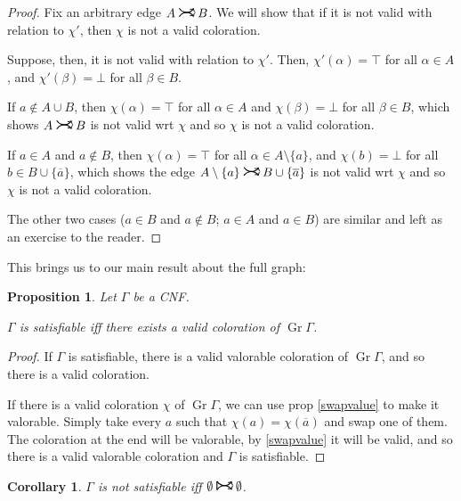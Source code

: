 \documentclass[11pt]{article}
\newcommand{\conj}[1]{\overline{#1}}
\DeclareMathOperator{\Gr}{Gr}
\newcommand{\rightcurvearrow}{
\mathrel{
  \begin{tikzpicture}[scale=0.8]
    \draw[thick,->] (0,1ex) arc (30:150:-2ex);
    \draw[thick,->] (0,-1ex) arc (150:30:2ex);
  \end{tikzpicture}
}
}
\newcommand{\Rightcurvearrow}{
\mathrel{
  \begin{tikzpicture}[scale=0.8]
    \draw[thick,->] (0,1ex) arc (30:150:-2ex);
    \draw[thick,->] (0,-1ex) arc (150:30:2ex);
    \draw[thick] (0, 1ex) -- (0, -1ex);
  \end{tikzpicture}
}
}
\newtheorem{prop}{Proposition}
\newtheorem{corollary}{Corollary}
\begin{document}
\begin{proof}
Fix an arbitrary edge $A \rightcurvearrow B$. We will show that if it is not valid with relation to $\chi'$, then $\chi$ is not a valid coloration.

Suppose, then, it is not valid with relation to $\chi'$. Then, $\chi'(\alpha) = \top$ for all $\alpha \in A$, and $\chi'(\beta) = \bot$ for all $\beta \in B$.

If $a \not \in A \cup B$, then $\chi(\alpha) = \top$ for all $\alpha \in A$ and $\chi(\beta) = \bot$ for all $\beta \in B$, which shows $A \rightcurvearrow B$ is not valid wrt $\chi$ and so $\chi$ is not a valid coloration.

If $a \in A$ and $a \not \in B$, then $\chi(\alpha) = \top$ for all $\alpha \in A \setminus \{a\}$, and $\chi(b) = \bot$ for all $b \in B \cup \{\conj a\}$, which shows the edge $A \setminus \{a\} \rightcurvearrow B \cup \{\conj a\}$ is not valid wrt $\chi$ and so $\chi$ is not a valid coloration.

The other two cases ($a \in B$ and $a \not \in B$; $a \in A$ and $a \in B$) are similar and left as an exercise to the reader.

\end{proof}

This brings us to our main result about the full graph:

\begin{prop}
Let $\Gamma$ be a CNF.

$\Gamma$ is satisfiable iff there exists a valid coloration of $\Gr \Gamma$.
\end{prop}

\begin{proof}
If $\Gamma$ is satisfiable, there is a valid valorable coloration of $\Gr \Gamma$, and so there is a valid coloration.

If there is a valid coloration $\chi$ of $\Gr \Gamma$, we can use prop \ref{swapvalue} to make it valorable. Simply take every $a$ such that $\chi(a) = \chi(\conj a)$ and swap one of them. The coloration at the end will be valorable, by \ref{swapvalue} it will be valid, and so there is a valid valorable coloration and $\Gamma$ is satisfiable.
\end{proof}

\begin{corollary}
$\Gamma$ is not satisfiable iff $\emptyset \Rightcurvearrow \emptyset$.
\end{corollary}
\end{document}
